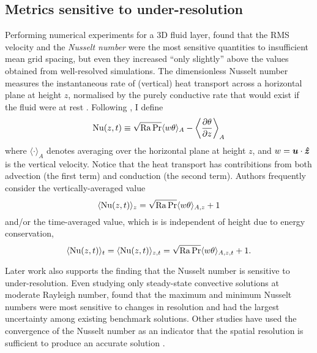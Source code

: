 \documentclass[../main.tex]{subfiles}
\begin{document}
\subsection{Metrics sensitive to under-resolution} \label{sec:metrics}
Performing numerical experiments for a 3D fluid layer,
\citeauthor{grotzbach1983} found that the RMS velocity and the \emph{Nusselt
number} were the most sensitive quantities to insufficient mean grid spacing,
but even they increased ``only slightly'' above the values obtained from
well-resolved simulations. The dimensionless Nusselt number measures the
instantaneous rate of (vertical) heat transport across a horizontal plane at
height $z$, normalised by the purely conductive rate that would exist if the
fluid were at rest \parencite{verzicco1999}. Following \textcite{kooij2018}, I
define
\begin{equation}
    \label{eqn:nusselt}
    \mathrm{Nu}(z,t) \equiv \sqrt{\mathrm{Ra}\,\mathrm{Pr}} \langle w \theta \rangle_A
        - \left\langle \frac{\partial \theta}{\partial z} \right\rangle _A
\end{equation}
where $\langle \cdot \rangle_A$ denotes averaging over the horizontal plane at
height $z$, and $w = \bm{u} \cdot \bm{\hat{z}}$ is the vertical velocity. Notice
that the heat transport has contribitions from both advection (the first term)
and conduction (the second term). Authors frequently consider the
vertically-averaged value
\[
    \langle \mathrm{Nu}(z,t) \rangle_z
        = \sqrt{\mathrm{Ra}\,\mathrm{Pr}} \langle w \theta \rangle_{A,z} + 1
\]
and/or the time-averaged value, which is is independent of height due to
energy conservation,
\[
    \langle \mathrm{Nu}(z,t) \rangle_t = \langle \mathrm{Nu}(z,t) \rangle_{z,t}
        = \sqrt{\mathrm{Ra}\,\mathrm{Pr}} \langle w \theta \rangle_{A,z,t} + 1.
\]

Later work also supports the finding that the Nusselt number is sensitive to
under-resolution. Even studying only steady-state convective solutions at
moderate Rayleigh number, \textcite{le_quere1991} found that the maximum and
minimum Nusselt numbers were most sensitive to changes in resolution and had
the largest uncertainty among existing benchmark solutions.
Other studies have used the convergence of the Nusselt number as an indicator
that the spatial resolution is sufficient to produce an accurate solution
\parencite{ouertatani2008}.
\end{document}
